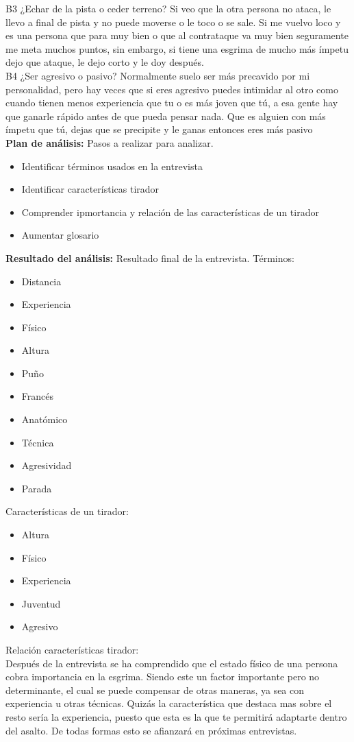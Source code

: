 B3 ¿Echar de la pista o ceder terreno?
Si veo que la otra persona no ataca, le llevo a final de pista y no puede moverse o le toco o se
sale. Si me vuelvo loco y es una persona que para muy bien o que al contrataque va muy bien
seguramente me meta muchos puntos, sin embargo, si tiene una esgrima de mucho más ímpetu
dejo que ataque, le dejo corto y le doy después.
\\

B4 ¿Ser agresivo o pasivo?
Normalmente suelo ser más precavido por mi personalidad, pero hay veces que si eres agresivo
puedes intimidar al otro como cuando tienen menos experiencia que tu o es más joven que tú,
a esa gente hay que ganarle rápido antes de que pueda pensar nada. Que es alguien con más
ímpetu que tú, dejas que se precipite y le ganas entonces eres más pasivo
\\

\textbf{Plan de análisis:} Pasos a realizar para analizar.
\begin{itemize}
  \item Identificar términos usados en la entrevista
  \item Identificar características tirador
  \item Comprender ipmortancia y relación de las características de un tirador
  \item Aumentar glosario
\end{itemize}

\textbf{Resultado del análisis:} Resultado final de la entrevista.
Términos:
\begin{itemize}
  \item Distancia
  \item Experiencia
  \item Físico
  \item Altura
  \item Puño
  \item Francés
  \item Anatómico
  \item Técnica
  \item Agresividad
  \item Parada
\end{itemize}

Características de un tirador:
\begin{itemize}
  \item Altura
  \item Físico
  \item Experiencia
  \item Juventud
  \item Agresivo
\end{itemize}

Relación características tirador: \\
Después de la entrevista se ha comprendido que el estado físico de una persona cobra importancia
 en la esgrima. Siendo este un factor importante pero no determinante, el cual se puede
 compensar de otras maneras, ya sea con experiencia u otras técnicas. Quizás la característica
 que destaca mas sobre el resto sería la experiencia, puesto que esta es la que te permitirá
 adaptarte dentro del asalto. De todas formas esto se afianzará en próximas entrevistas.

